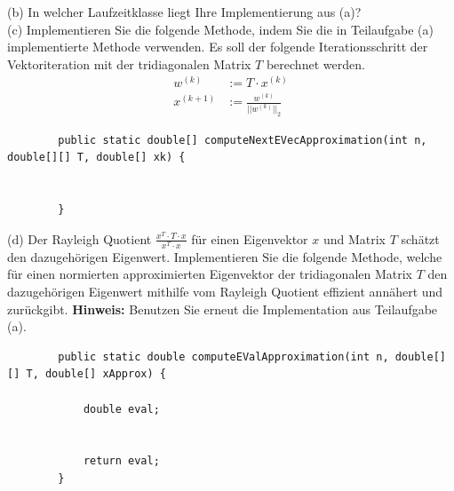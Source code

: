 \documentclass{scrartcl}
\begin{document}
	\lbreak   
	(b)
	In welcher Laufzeitklasse liegt Ihre Implementierung aus (a)?
	\lbreak  \lbreak
	\\
	(c)
	Implementieren Sie die folgende Methode, indem Sie die in Teilaufgabe (a) implementierte Methode verwenden. Es soll der folgende Iterationsschritt der Vektoriteration mit der tridiagonalen Matrix $T$ berechnet werden.
	\begin{align*}
		w^{(k)} &:= T \cdot x^{(k)} \\
		x^{(k+1)} &:= \frac{w^{(k)}}{||w^{(k)}||_2}
	\end{align*}
	\begin{lstlisting}
		public static double[] computeNextEVecApproximation(int n, double[][] T, double[] xk) {
		
		
		}
	\end{lstlisting}
	\lbreak
	(d)
	Der Rayleigh Quotient $\frac{x^T \cdot T \cdot x}{x^T \cdot x}$ für einen Eigenvektor $x$ und Matrix $T$ schätzt den dazugehörigen Eigenwert.
	\n 
	Implementieren Sie die folgende Methode, welche für einen normierten approximierten Eigenvektor der tridiagonalen Matrix $T$ den dazugehörigen Eigenwert mithilfe vom Rayleigh Quotient effizient annähert und zurückgibt.
	\n 
	\textbf{Hinweis:} Benutzen Sie erneut die Implementation aus Teilaufgabe (a).
	\begin{lstlisting}
		public static double computeEValApproximation(int n, double[][] T, double[] xApprox) {
		
			double eval;
		
		
			return eval;
		}
	\end{lstlisting}
	
	
\end{document}
